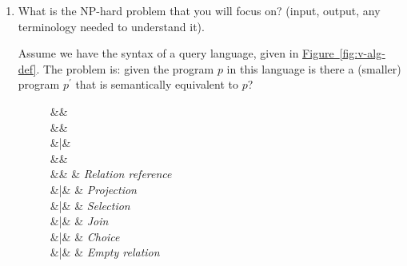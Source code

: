 \documentclass[sigconf]{acmart}
\newcommand{\figref}[1]{\hyperref[fig:#1]{Figure~\ref*{fig:#1}}}
\begin{document}
\begin{enumerate}
\item
What is the NP-hard problem that you will focus on? (input, output, any terminology needed to understand it).

Assume we have the syntax of a query language, given in \figref{v-alg-def}.
The problem is: given the program $p$ in this language is there a (smaller) program $p^\prime$ that is semantically equivalent to $p$? 
\begin{figure}

\begin{syntax}

\synDef{\dimMeta}{\ffSet}
  &\eqq& 
\\[1.5ex]

\synDef{\vCond}{\vCondSet}
  &\eqq&  \\
     &|& 
\\[1.5ex]

\synDef{\vAttList}{\vAttSet}
  &\eqq&  
  \\[1.5ex]
  
\synDef{\vQ}{\qSet}
  &\eqq& \vRel                 & \textit{Relation reference} \\
     &|& \vPrj[\vAttList]{\vQ} & \textit{Projection} \\
     &|& \vSel\vQ              & \textit{Selection} \\
     &|& \vQ \times \vQ  & \textit{Join} \\
     &|& \chc{\vQ,\vQ}         & \textit{Choice} \\
     &|& \empRel               & \textit{Empty relation} \\
\end{syntax}


\end{figure}
\end{enumerate}
\end{document}
